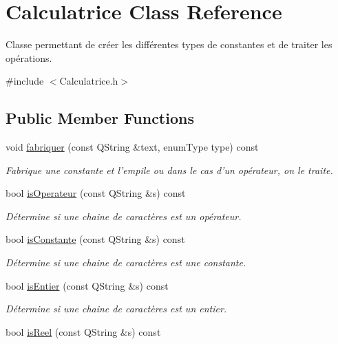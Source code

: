 \hypertarget{classCalculatrice}{\section{\-Calculatrice \-Class \-Reference}
\label{classCalculatrice}
}


\-Classe permettant de créer les différentes types de constantes et de traiter les opérations.  




{\ttfamily \#include $<$\-Calculatrice.\-h$>$}

\subsection*{\-Public \-Member \-Functions}
\begin{DoxyCompactItemize}
\item 
void \hyperlink{classCalculatrice_a4ed7c7c9b349d7c469d0622a43c28969}{fabriquer} (const \-Q\-String \&text, enum\-Type type) const 
\begin{DoxyCompactList}\small\item\em \-Fabrique une constante et l'empile ou dans le cas d'un opérateur, on le traite. \end{DoxyCompactList}\item 
bool \hyperlink{classCalculatrice_a6e5a1fbf232590f4f62cfc74625037cd}{is\-Operateur} (const \-Q\-String \&s) const 
\begin{DoxyCompactList}\small\item\em \-Détermine si une chaine de caractères est un opérateur. \end{DoxyCompactList}\item 
bool \hyperlink{classCalculatrice_a890ae3d00b6eb9d244487c5845ab99e1}{is\-Constante} (const \-Q\-String \&s) const 
\begin{DoxyCompactList}\small\item\em \-Détermine si une chaine de caractères est une constante. \end{DoxyCompactList}\item 
bool \hyperlink{classCalculatrice_aefc17b819882371bf7bf4598e95eacd7}{is\-Entier} (const \-Q\-String \&s) const 
\begin{DoxyCompactList}\small\item\em \-Détermine si une chaine de caractères est un entier. \end{DoxyCompactList}\item 
bool \hyperlink{classCalculatrice_a4f7cf40bbf5c34b57f6e5425ce6a3474}{is\-Reel} (const \-Q\-String \&s) const 

\end{DoxyCompactItemize}
